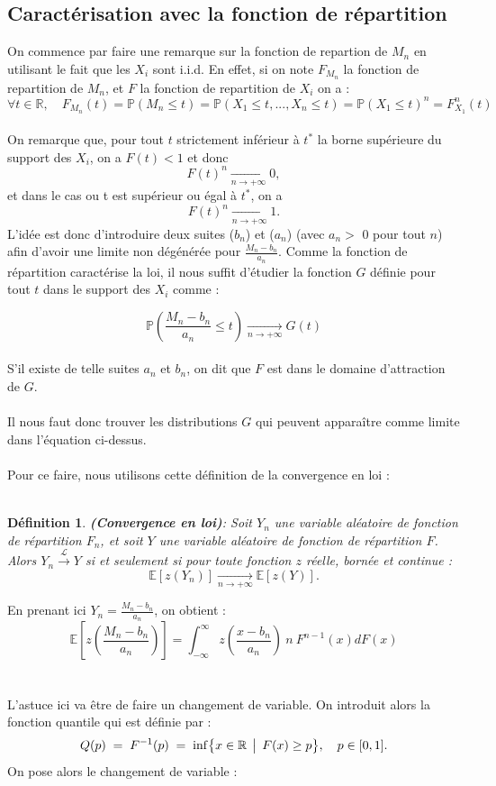 \documentclass{article}
\theoremstyle{plain}
\newtheorem{definition}{Définition}[section]
\theoremstyle{definition}
\theoremstyle{plain}
\begin{document}
\subsection{Caractérisation avec la fonction de répartition}

On commence par faire une remarque sur la fonction de repartion de $M_n$ en utilisant le fait que les $X_i$ sont i.i.d.
En effet, si on note $F_{M_n}$ la fonction de repartition de $M_n$, et $F$ la fonction de repartition de $X_i$ on a :
\[
\forall t \in \mathbb{R} , \quad F_{M_n}(t) = \mathbb{P}(M_n \le t) = \mathbb{P}(X_1 \le t,...,X_n \le t)=\mathbb{P}(X_1 \le t)^n = F_{X_1}^n(t) 
\]
\\
On remarque que, pour tout $t$ strictement inférieur à $t^*$ la borne supérieure du support des $X_i$, on a $F(t)<1$ et donc
\[
F(t)^n \xrightarrow[n\to +\infty]{} 0,
\]
et dans le cas ou t est supérieur ou égal à $t^*$, on a
\[
F(t)^n \xrightarrow[n\to +\infty]{} 1.
\]
L'idée est donc d'introduire deux suites ($b_n$) et ($a_n$) (avec $a_n > $  0 pour tout $n$) afin d'avoir une limite non dégénérée pour $\frac{M_n - b_n}{a_n}$. Comme la fonction de répartition caractérise la loi, il nous suffit d'étudier la fonction $G$ définie pour tout $t$ dans le support des $X_i$ comme :

\[
\mathbb{P} \left( \frac{M_n - b_n}{a_n} \le t \right) \xrightarrow[n\to +\infty]{} G(t)
\]
\\
S'il existe de telle suites $a_n$ et $b_n$, on dit que $F$ est dans le domaine d'attraction de $G$.
\\
\\
Il nous faut donc trouver les distributions $G$ qui peuvent apparaître comme limite dans l’équation ci-dessus.
\\
\\
Pour ce faire, nous utilisons cette définition de la convergence en loi :
\\
\\
\begin{definition}
\textbf{(Convergence en loi)}:
Soit \( Y_n \) une variable aléatoire de fonction de répartition \( F_n \), et soit \( Y \) une variable aléatoire de fonction de répartition \( F \).  
Alors $Y_n \xrightarrow{\mathcal{L} } Y$ si et seulement si pour toute fonction $z$ réelle, bornée et continue :
\[
\mathbb{E}[z(Y_n)] \xrightarrow[n\to +\infty]{} \mathbb{E}[z(Y)].
\]
\end{definition}
\noindent En prenant ici $Y_n = \frac{M_n -b_n}{a_n}$, on obtient :
\[
\mathbb{E}[z(\frac{M_n -b_n}{a_n})] = \int_{-\infty}^{\infty} z(\frac{x-b_n}{a_n}) \: n \:  F^{n-1} (x)dF(x)
\]
\\
\\
L'astuce ici va être de faire un changement de variable. On introduit alors la fonction quantile qui est définie par :
\\
\[
Q(p) \;=\; F^{-1}(p)
\;=\;
\inf\bigl\{x\in\mathbb{R}\,\bigm|\,F(x)\ge p\bigr\},
\quad p\in[0,1].
\]
\medskip 
\noindent On pose alors le changement de variable : 
\end{document}
